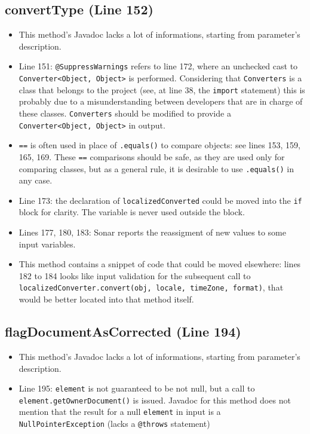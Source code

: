 \documentclass[11pt]{article} %
\begin{document}
\subsection{convertType (Line 152)}
\begin{itemize}
	\item This method's Javadoc lacks a lot of informations, starting from parameter's description.
	\item Line 151: \texttt{@SuppressWarnings} refers to line 172, where an unchecked cast to \texttt{Converter<Object, Object>} is performed. Considering that \texttt{Converters} is a class that belongs to the project (see, at line 38, the \texttt{import} statement) this is probably due to a misunderstanding between developers that are in charge of these classes. \texttt{Converters} should be modified to provide a \texttt{Converter<Object, Object>} in output.
	\item \texttt{==} is often used in place of \texttt{.equals()} to compare objects: see lines 153, 159, 165, 169. These \texttt{==} comparisons should be safe, as they are used only for comparing classes, but as a general rule, it is desirable to use \texttt{.equals()} in any case.
	\item Line 173: the declaration of \texttt{localizedConverted} could be moved into the \texttt{if} block for clarity. The variable is never used outside the block.
	\item Lines 177, 180, 183: Sonar reports the reassigment of new values to some input variables.
	\item This method contains a snippet of code that could be moved elsewhere: lines 182 to 184 looks like input validation for the subsequent call to \texttt{localizedConverter.convert(obj, locale, timeZone, format)}, that would be better located into that method itself.
\end{itemize}

\subsection{flagDocumentAsCorrected (Line 194)}
\begin{itemize}
	\item This method's Javadoc lacks a lot of informations, starting from parameter's description.
	\item Line 195: \texttt{element} is not guaranteed to be not null, but a call to \texttt{element.getOwnerDocument()} is issued. Javadoc for this method does not mention that the result for a null \texttt{element} in input is a \texttt{NullPointerException} (lacks a \texttt{@throws} statement)
\end{itemize}
\end{document}
